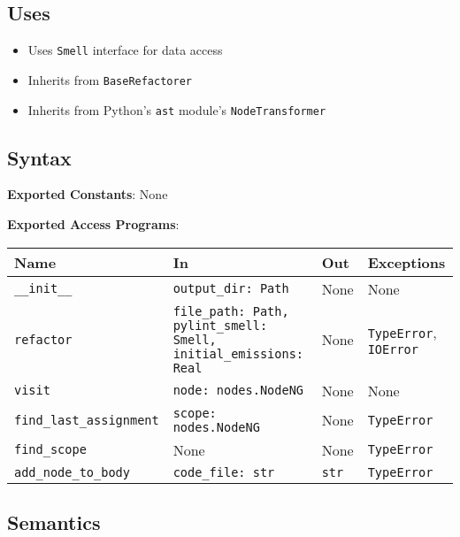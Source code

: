 \documentclass[12pt, titlepage]{article}
\begin{document}
\subsection{Uses}
\begin{itemize}
  \item Uses \texttt{Smell} interface for data access
  \item Inherits from \texttt{BaseRefactorer}
  \item Inherits from Python's \texttt{ast} module's \texttt{NodeTransformer}
\end{itemize}
  
\subsection{Syntax}
\noindent
\textbf{Exported Constants}: None

\noindent
\textbf{Exported Access Programs}:
  
\begin{tabularx}{\linewidth}{|
    l|
    >{\raggedright\arraybackslash}X|
    l|
    l|}
  \toprule Name & In & Out & Exceptions \\
  \midrule
  \texttt{\_\_init\_\_} & \texttt{output\_dir: Path} & None & None \\
  \hline
  \texttt{refactor} & \texttt{file\_path: Path, pylint\_smell: Smell, initial\_emissions: Real} & None & \texttt{TypeError}, \texttt{IOError} \\
  \hline
  \texttt{visit} & \texttt{node: nodes.NodeNG} & None & None \\
  \hline
  \texttt{find\_last\_assignment} & \texttt{scope: nodes.NodeNG} & None & \texttt{TypeError} \\
  \hline
  \texttt{find\_scope} & None & None & \texttt{TypeError} \\
  \hline
  \texttt{add\_node\_to\_body} & \texttt{code\_file: str} & \texttt{str} & \texttt{TypeError} \\
  \bottomrule
\end{tabularx}
  
\subsection{Semantics}
  
\end{document}
